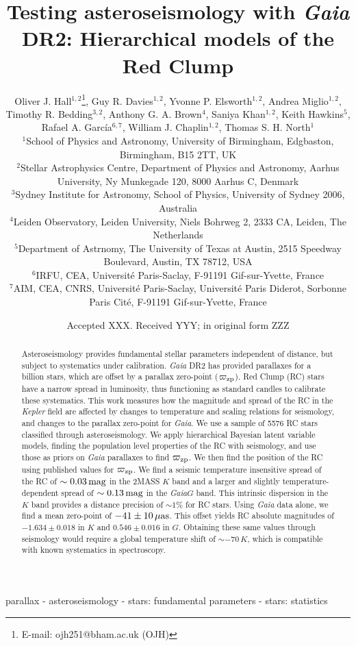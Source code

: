 \documentclass[fleqn,usenatbib]{mnras}
\title[Testing systematics with the Red Clump]{Testing asteroseismology with \textit{Gaia} DR2: Hierarchical models of the Red Clump}
\author[O. J. Hall et al.]{Oliver J. Hall$^{1,2}$\thanks{E-mail: ojh251@bham.ac.uk (OJH)}, 
Guy R. Davies$^{1,2}$,
Yvonne P. Elsworth$^{1,2}$,
Andrea Miglio$^{1,2}$, 
\newauthor Timothy R. Bedding$^{3,2}$,
Anthony G. A. Brown$^{4}$,
Saniya Khan$^{1,2}$,
Keith Hawkins$^{5}$,
\newauthor Rafael A. Garc\'ia$^{6, 7}$,
William J. Chaplin$^{1, 2}$,
Thomas S. H. North$^{1}$ 
\\
$^{1}$School of Physics and Astronomy, University of Birmingham, Edgbaston, Birmingham, B15 2TT, UK\\
$^{2}$Stellar Astrophysics Centre, Department of Physics and Astronomy, Aarhus University, Ny Munkegade 120, 8000 Aarhus C, Denmark\\
$^{3}$Sydney Institute for Astronomy, School of Physics, University of Sydney 2006, Australia\\
$^{4}$Leiden Observatory, Leiden University, Niels Bohrweg 2, 2333 CA, Leiden, The Netherlands\\
$^{5}$Department of Astrnomy, The University of Texas at Austin, 2515 Speedway Boulevard, Austin, TX 78712, USA\\
$^{6}$IRFU, CEA, Universit\'e Paris-Saclay, F-91191 Gif-sur-Yvette, France\\
$^{7}$AIM, CEA, CNRS, Universit\'e Paris-Saclay, Universit\'e Paris Diderot, Sorbonne Paris Cit\'e, F-91191 Gif-sur-Yvette, France\\
}
\date{Accepted XXX. Received YYY; in original form ZZZ}
\newcommand{\oozp}{\mbox{$\varpi_{\rm zp}$}\xspace}
\newcommand{\nstars}{5576 \xspace} %
\newcommand{\kepler}{\emph{Kepler}\xspace}
\newcommand{\gaia}{\emph{Gaia}\xspace}
\begin{document}
\label{firstpage}
\pagerange{\pageref{firstpage}--\pageref{lastpage}}
\maketitle

\begin{abstract}
Asteroseismology provides fundamental stellar parameters independent of distance, but subject to systematics under calibration. \gaia DR2 has provided parallaxes for a billion stars, which are offset by a parallax zero-point (\oozp). Red Clump (RC) stars have a narrow spread in luminosity, thus functioning as standard candles to calibrate these systematics.
This work measures how the magnitude and spread of the RC in the \kepler field are affected by changes to temperature and scaling relations for seismology, and changes to the parallax zero-point for \gaia. We use a sample of \nstars RC stars classified through asteroseismology.
We apply hierarchical Bayesian latent variable models, finding the population level properties of the RC with seismology, and use those as priors on \gaia parallaxes to find \oozp. We then find the position of the RC using published values for \oozp.
We find a seismic temperature insensitive spread of the RC of $\sim0.03\, \rm mag$ in the 2MASS $K$ band and a larger and slightly temperature-dependent spread of $\sim0.13\, \rm mag$ in the \gaia $G$ band. This intrinsic dispersion in the $K$ band provides a distance precision of $\sim 1\%$ for RC stars. Using \gaia data alone, we find a mean zero-point of $-41\pm10\, \mu \rm as$. This offset yields RC absolute magnitudes of $-1.634\pm0.018$ in $K$ and $0.546\pm0.016$ in $G$. Obtaining these same values through seismology would require a global temperature shift of $\sim-70\, K$, which is compatible with known systematics in spectroscopy.\\
\end{abstract}

\begin{keywords}
parallax - asteroseismology - stars: fundamental parameters - stars: statistics
\end{keywords}


\end{document}

